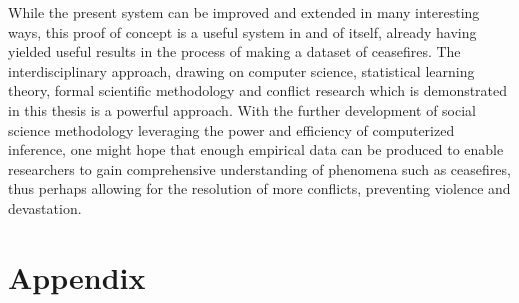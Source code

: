 \documentclass[12pt,twoside]{reedthesis}
\begin{document}
While the present system can be improved and extended in many
interesting ways, this proof of concept is a useful system in and of
itself, already having yielded useful results in the process of making a
dataset of ceasefires. The interdisciplinary approach, drawing on
computer science, statistical learning theory, formal scientific
methodology and conflict research which is demonstrated in this thesis
is a powerful approach. With the further development of social science
methodology leveraging the power and efficiency of computerized
inference, one might hope that enough empirical data can be produced to
enable researchers to gain comprehensive understanding of phenomena such
as ceasefires, thus perhaps allowing for the resolution of more
conflicts, preventing violence and devastation.

\newpage

\null

\chapter*{Appendix}\label{appendix}
\end{document}
